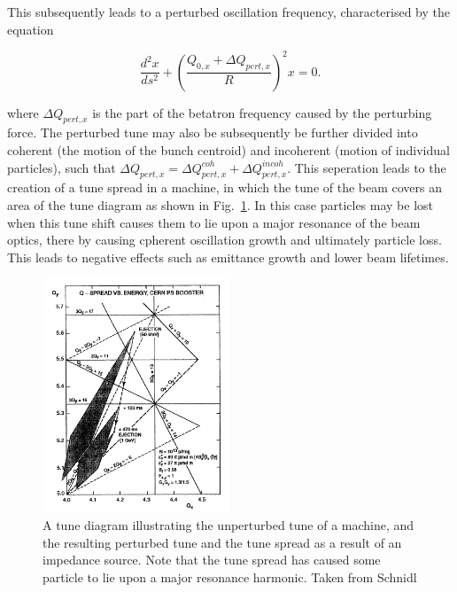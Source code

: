 This subsequently leads to a perturbed oscillation frequency, characterised by the equation

\begin{equation}
\frac{d^{2}x}{ds^{2}} + \left(\frac{Q_{0,x}+ \Delta Q_{pert,x}}{R}\right)^{2} x = 0.
\end{equation}

where $\Delta Q_{pert,x}$ is the part of the betatron frequency caused by the perturbing force. The perturbed tune may also be subsequently be further divided into coherent (the motion of the bunch centroid) and incoherent (motion of individual particles), such that $\Delta Q_{pert,x} = \Delta Q^{coh}_{pert, x} + \Delta Q^{incoh}_{pert, x}$. This seperation leads to the creation of a tune spread in a machine, in which the tune of the beam covers an area of the tune diagram as shown in Fig.~\ref{fig:tune_diag_tune_shift}. In this case particles may be lost when this tune shift causes them to lie upon a major resonance of the beam optics, there by causing cpherent oscillation growth and ultimately particle loss. This leads to negative effects such as emittance growth and lower beam lifetimes.

\begin{figure}
\begin{center}
\includegraphics[width=0.5\textwidth]{Wakefields_and_Impedances/figures/tune-spread-sc.png}
\end{center}
\caption{A tune diagram illustrating the unperturbed tune of a machine, and the resulting perturbed tune and the tune spread as a result of an impedance source. Note that the tune spread has caused some particle to lie upon a major resonance harmonic. Taken from Schnidl}
\label{fig:tune_diag_tune_shift}
\end{figure}

